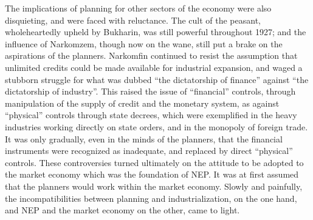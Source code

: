 The implications of planning for other sectors of the economy were also disquieting, and were faced with reluctance. The cult of the peasant, wholeheartedly upheld by Bukharin, was still powerful throughout 1927; and the influence of Narkomzem, though now on the wane, still put a brake on the aspirations of the planners. Narkomfin continued to resist the assumption that unlimited credits could be made available for industrial expansion, and waged a stubborn struggle for what was dubbed ``the dictatorship of finance'' against ``the dictatorship of industry''. This raised the issue of ``financial'' controls, through manipulation of the supply of credit and the monetary system, as against ``physical'' controls through state decrees, which were exemplified in the heavy industries working directly on state orders, and in the monopoly of foreign trade. It was only gradually, even in the minds of the planners, that the financial instruments were recognized as inadequate, and replaced by direct ``physical'' controls. These controversies turned ultimately on the attitude to be adopted to the market economy which was the foundation of NEP. It was at first assumed that the planners would work within the market economy. Slowly and painfully, the incompatibilities between planning and industrialization, on the one hand, and NEP and the market economy on the other, came to light.
